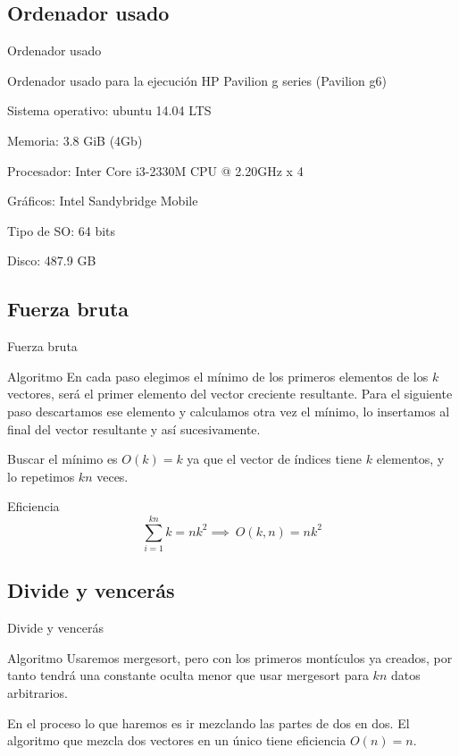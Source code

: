 \subsection{Ordenador usado}
\begin{frame}{Ordenador usado}
	\begin{alertblock}{Ordenador usado para la ejecuci\'on}
	HP Pavilion g series (Pavilion g6)

	Sistema operativo: ubuntu 14.04 LTS

	Memoria: 3.8 GiB (4Gb)

	Procesador: Inter Core i3-2330M CPU @ 2.20GHz x 4

	Gráficos: Intel Sandybridge Mobile

	Tipo de SO: 64 bits

	Disco: 487.9 GB	
	\end{alertblock}
\end{frame}


\subsection{Fuerza bruta}
\begin{frame}{Fuerza bruta}
	\begin{block}{Algoritmo}
	En cada paso elegimos el mínimo de los primeros elementos de los $k$ vectores, será el 	primer elemento del vector creciente resultante.
	Para el siguiente paso descartamos ese elemento y calculamos otra vez el mínimo, lo 			insertamos al final del vector resultante y así sucesivamente.

	Buscar el mínimo es $O(k)=k$ ya que el vector de índices tiene $k$ 							elementos, y lo repetimos $kn$ veces.
	\end{block}
	
	\begin{exampleblock}{Eficiencia}
	\[\sum_{i=1}^{kn}k = nk^2 \implies \ O(k,n)=nk^2\]
	\end{exampleblock}
\end{frame}

\subsection{Divide y vencerás}
\begin{frame}{Divide y vencerás}
	\begin{block}{Algoritmo}
	Usaremos mergesort, pero con los primeros montículos ya creados, por tanto tendrá una 		constante oculta menor que usar mergesort para $kn$ datos arbitrarios. 
	
	En el proceso lo que haremos es ir mezclando las partes de dos en dos. El algoritmo 			que mezcla dos vectores en un único tiene eficiencia $O(n) = n$.
	\end{block}
\end{frame}


